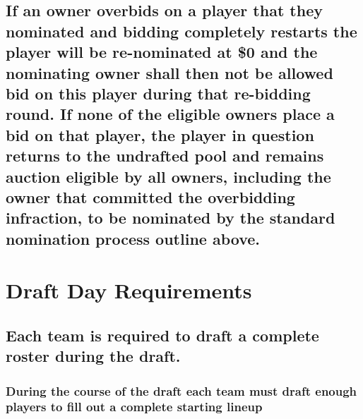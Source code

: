 \documentclass[
]{book}
\begin{document}
\hypertarget{if-an-owner-overbids-on-a-player-that-they-nominated-and-bidding-completely-restarts-the-player-will-be-re-nominated-at-0-and-the-nominating-owner-shall-then-not-be-allowed-bid-on-this-player-during-that-re-bidding-round.-if-none-of-the-eligible-owners-place-a-bid-on-that-player-the-player-in-question-returns-to-the-undrafted-pool-and-remains-auction-eligible-by-all-owners-including-the-owner-that-committed-the-overbidding-infraction-to-be-nominated-by-the-standard-nomination-process-outline-above.}{%
\subsection{If an owner overbids on a player that they nominated and bidding completely restarts the player will be re-nominated at \$0 and the nominating owner shall then not be allowed bid on this player during that re-bidding round. If none of the eligible owners place a bid on that player, the player in question returns to the undrafted pool and remains auction eligible by all owners, including the owner that committed the overbidding infraction, to be nominated by the standard nomination process outline above.}\label{if-an-owner-overbids-on-a-player-that-they-nominated-and-bidding-completely-restarts-the-player-will-be-re-nominated-at-0-and-the-nominating-owner-shall-then-not-be-allowed-bid-on-this-player-during-that-re-bidding-round.-if-none-of-the-eligible-owners-place-a-bid-on-that-player-the-player-in-question-returns-to-the-undrafted-pool-and-remains-auction-eligible-by-all-owners-including-the-owner-that-committed-the-overbidding-infraction-to-be-nominated-by-the-standard-nomination-process-outline-above.}}

\hypertarget{draft-day-requirements}{%
\section{Draft Day Requirements}\label{draft-day-requirements}}

\hypertarget{each-team-is-required-to-draft-a-complete-roster-during-the-draft.}{%
\subsection{Each team is required to draft a complete roster during the draft.}\label{each-team-is-required-to-draft-a-complete-roster-during-the-draft.}}

\hypertarget{during-the-course-of-the-draft-each-team-must-draft-enough-players-to-fill-out-a-complete-starting-lineup}{%
\subsubsection{During the course of the draft each team must draft enough players to fill out a complete starting lineup}\label{during-the-course-of-the-draft-each-team-must-draft-enough-players-to-fill-out-a-complete-starting-lineup}}
\end{document}
